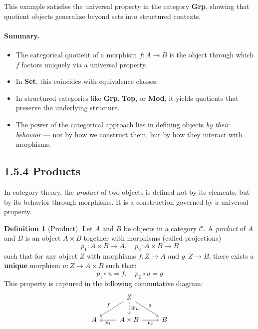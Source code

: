 \documentclass[10pt]{article}
\theoremstyle{plain}
\theoremstyle{definition}
\newtheorem{definition}{Definition}[section]
\begin{document}
  This example satisfies the universal property in the category \textbf{Grp}, showing that quotient objects generalize beyond sets into structured contexts.
  
  \paragraph{Summary.}
  \begin{itemize}
  	\item The categorical quotient of a morphism $f : A \to B$ is the object through which $f$ factors uniquely via a universal property.
  	\item In \textbf{Set}, this coincides with equivalence classes.
  	\item In structured categories like \textbf{Grp}, \textbf{Top}, or \textbf{Mod}, it yields quotients that preserve the underlying structure.
  	\item The power of the categorical approach lies in defining objects \emph{by their behavior} — not by how we construct them, but by how they interact with morphisms.
  \end{itemize}
  
  
  \subsection*{1.5.4 Products}
  
  In category theory, the \emph{product} of two objects is defined not by its elements, but by its behavior through morphisms. It is a construction governed by a universal property.
  
  \begin{definition}[Product]
  	Let $A$ and $B$ be objects in a category $\mathcal{C}$. A \emph{product} of $A$ and $B$ is an object $A \times B$ together with morphisms (called projections)
  	\[
  	p_1 : A \times B \to A,\quad p_2 : A \times B \to B
  	\]
  	such that for any object $Z$ with morphisms $f : Z \to A$ and $g : Z \to B$, there exists a \textbf{unique} morphism $u : Z \to A \times B$ such that:
  	\[
  	p_1 \circ u = f,\quad p_2 \circ u = g
  	\]
  	This property is captured in the following commutative diagram:
  	\[
  	\begin{tikzcd}
  		& Z \arrow[dl, "f"'] \arrow[dr, "g"] \arrow[dashed]{d}{\exists! u} & \\
  		A & A \times B \arrow[l, "p_1"] \arrow[r, "p_2"'] & B
  	\end{tikzcd}
  	\]
  \end{definition}
  
\end{document}
